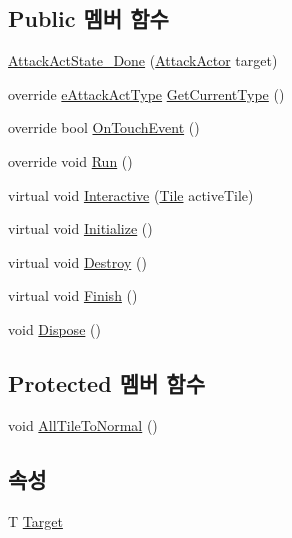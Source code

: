 \subsection*{Public 멤버 함수}
\begin{DoxyCompactItemize}
\item 
\hyperlink{class_attack_actor_1_1_attack_act_state___done_a57cc20f4a46c32a80eed29122c71c2e0}{Attack\+Act\+State\+\_\+\+Done} (\hyperlink{class_attack_actor}{Attack\+Actor} target)
\item 
override \hyperlink{_attack_actor_8cs_a10659ce944335df4ded984f6bc41f31b}{e\+Attack\+Act\+Type} \hyperlink{class_attack_actor_1_1_attack_act_state___done_aa72d89d74242db3347ae95f317a6268e}{Get\+Current\+Type} ()
\item 
override bool \hyperlink{class_attack_actor_1_1_attack_act_state___done_ae982c0e989161fdb1481d799c4e48369}{On\+Touch\+Event} ()
\item 
override void \hyperlink{class_attack_actor_1_1_attack_act_state___done_a87dc9fe06b7132e7eff68fce885c2cd2}{Run} ()
\item 
virtual void \hyperlink{class_attack_actor_1_1_attack_act_state_a2ae9dd2f7ec8db76d25d7ad7ed58b89d}{Interactive} (\hyperlink{class_tile}{Tile} active\+Tile)
\item 
virtual void \hyperlink{class_f_z_1_1_state_a27ac6fd2e844476017b35aa781d73c8c}{Initialize} ()
\item 
virtual void \hyperlink{class_f_z_1_1_state_aa85fdf4a5495d6d5d3ed4aeda3497c8a}{Destroy} ()
\item 
virtual void \hyperlink{class_f_z_1_1_state_a288bb8c3fceee4bf03f01e295dcef1be}{Finish} ()
\item 
void \hyperlink{class_f_z_1_1_state_a598887d3fbb412fada132dc1c079b25b}{Dispose} ()
\end{DoxyCompactItemize}
\subsection*{Protected 멤버 함수}
\begin{DoxyCompactItemize}
\item 
void \hyperlink{class_attack_actor_1_1_attack_act_state_a993762ec959af926e416f03fa7b71203}{All\+Tile\+To\+Normal} ()
\end{DoxyCompactItemize}
\subsection*{속성}
\begin{DoxyCompactItemize}
\item 
T \hyperlink{class_f_z_1_1_state_a6927f5c9f2517052f9dc5596188e9d95}{Target}
\end{DoxyCompactItemize}


